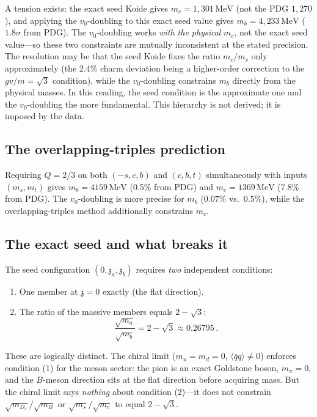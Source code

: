 \documentclass[12pt,a4paper]{article}
\newcommand{\MeV}{\,\text{MeV}}
\newcommand{\qqbar}{\langle\bar{q}q\rangle}
\newcommand{\zch}{\mathfrak{z}}
\begin{document}
A tension exists:
the exact seed Koide gives $m_c = 1{,}301\MeV$ (not the PDG
$1{,}270$), and applying the $v_0$-doubling to this exact seed
value gives $m_b = 4{,}233\MeV$ ($1.8\sigma$ from PDG). The
$v_0$-doubling works \emph{with the physical} $m_c$, not the exact
seed value---so these two constraints are mutually inconsistent at the
stated precision. The resolution may be that the seed Koide fixes the
ratio $m_c/m_s$ only approximately (the 2.4\% charm deviation being a
higher-order correction to the $gv/m = \sqrt{3}$ condition), while the
$v_0$-doubling constrains $m_b$ directly from the physical masses. In
this reading, the seed condition is the approximate one and the
$v_0$-doubling the more fundamental. This hierarchy is not derived;
it is imposed by the data.

\subsection{The overlapping-triples prediction}

Requiring $Q = 2/3$ on both $(-s,c,b)$ and $(c,b,t)$ simultaneously
with inputs $(m_s, m_t)$ gives $m_b = 4159\MeV$ (0.5\% from PDG) and
$m_c = 1369\MeV$ (7.8\% from PDG). The $v_0$-doubling is more
precise for $m_b$ ($0.07\%$ vs.\ $0.5\%$), while the overlapping-triples
method additionally constrains $m_c$.

\subsection{The exact seed and what breaks it}

The seed configuration $(0, \zch_a, \zch_b)$ requires \emph{two}
independent conditions:
\begin{enumerate}
\item One member at $\zch = 0$ exactly (the flat direction).
\item The ratio of the massive members equals $2 - \sqrt{3}$:
\begin{equation}
\frac{\sqrt{m_a}}{\sqrt{m_b}} = 2 - \sqrt{3} \approx 0.26795\,.
\end{equation}
\end{enumerate}
These are logically distinct. The chiral limit ($m_u = m_d = 0$,
$\qqbar \neq 0$) enforces condition (1) for the meson sector: the
pion is an exact Goldstone boson, $m_\pi = 0$, and the
$B$-meson direction sits at
the flat direction before acquiring mass. But the chiral limit says
\emph{nothing} about condition (2)---it does not constrain
$\sqrt{m_{D_s}}/\sqrt{m_B}$ or $\sqrt{m_s}/\sqrt{m_c}$
to equal $2 - \sqrt{3}$.
\end{document}
